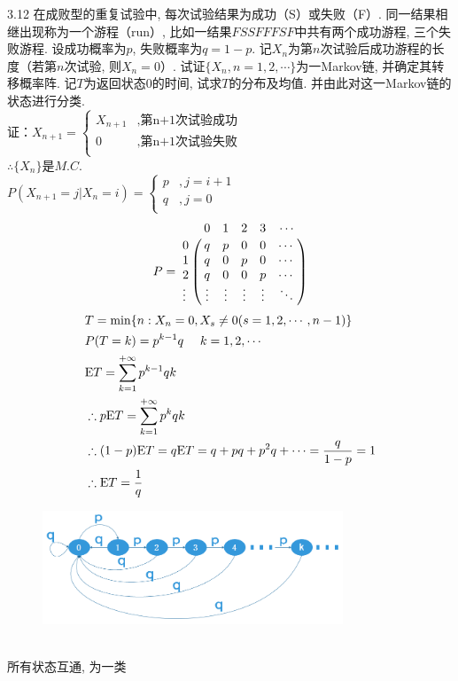 3.12 在成败型的重复试验中, 每次试验结果为成功（S）或失败（F）. 同一结果相继出现称为一个游程（run）, 比如一结果$FSSFFFSF$中共有两个成功游程, 三个失败游程. 设成功概率为$p$, 失败概率为$q = 1 - p$. 记$X_n$为第$n$次试验后成功游程的长度（若第$n$次试验, 则$X_n = 0$）. 试证$\{X_n, n = 1,2,\cdots\}$为一Markov链, 并确定其转移概率阵. 记$T$为返回状态$0$的时间, 试求$T$的分布及均值. 并由此对这一Markov链的状态进行分类.\\
证：$
	X_{n+1} = \begin{cases}
				X_{n+1} & , \text{第n+1次试验成功}\\
				0 & , \text{第n+1次试验失败}\\
				\end{cases}
	$\\
	$\therefore \{X_n\}$是$M.C.$\\
	$P(X_{n+1} = j | X_n = i) = \begin{cases}
		p & , j = i + 1\\
		q & , j = 0\\
		\end{cases}$
	\[
	P =
	\bordermatrix{
		~ & 0 & 1 & 2 & 3 & \cdots \cr
		0 & q & p & 0 & 0 & \cdots \cr
		1 & q & 0 & p & 0 & \cdots \cr
		2 & q & 0 & 0 & p & \cdots \cr
		\vdots & \vdots & \vdots & \vdots & \vdots & \ddots \cr
	}
	\]
	\[
	\begin{split}
	&T = \min \{n : X_n = 0, X_s \neq 0(s = 1,2,\cdots, n-1)\}\\
	&P(T = k) = p^{k-1}q~~~~k = 1, 2, \cdots\\
	&\mathrm{E} T = \sum^{+\infty}_{k=1}p^{k-1}qk\\
	&\therefore p\mathrm{E} T = \sum^{+\infty}_{k=1}p^kqk\\
	&\therefore (1-p)\mathrm{E} T = q\mathrm{E} T = q + pq + p^2q + \cdots = \frac{q}{1-p} = 1\\
	&\therefore \mathrm{E} T = \frac{1}{q}\\
	\end{split}
	\]
	\begin{figure}[htbp]
		\centering
		\includegraphics[width=0.8\textwidth]{resource/sp3_12.png}
	\end{figure}\\
	所有状态互通, 为一类\\



